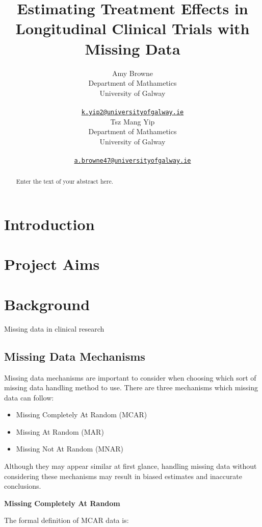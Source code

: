 \documentclass{article}
\title{Estimating Treatment Effects in Longitudinal Clinical Trials with
Missing Data}
\author{
    Amy Browne
   \\
    Department of Mathametics \\
    University of Galway \\
   \\
  \texttt{\href{mailto:k.yip2@universityofgalway.ie}{\nolinkurl{k.yip2@universityofgalway.ie}}} \\
   \And
    Tsz Mang Yip
   \\
    Department of Mathametics \\
    University of Galway \\
   \\
  \texttt{\href{mailto:a.browne47@universityofgalway.ie}{\nolinkurl{a.browne47@universityofgalway.ie}}} \\
  }
\providecommand{\tightlist}{%
  \setlength{\itemsep}{0pt}\setlength{\parskip}{0pt}}
\begin{document}
\maketitle


\begin{abstract}
Enter the text of your abstract here.
\end{abstract}


\section{Introduction}\label{introduction}

\section{Project Aims}\label{project-aims}

\section{Background}\label{background}

Missing data in clinical research

\subsection{Missing Data Mechanisms}\label{missing-data-mechanisms}

Missing data mechanisms are important to consider when choosing which
sort of missing data handling method to use. There are three mechanisms
which missing data can follow:

\begin{itemize}
\tightlist
\item
  Missing Completely At Random (MCAR)
\item
  Missing At Random (MAR)
\item
  Missing Not At Random (MNAR)
\end{itemize}

Although they may appear similar at first glance, handling missing data
without considering these mechanisms may result in biased estimates and
inaccurate conclusions.

\textbf{Missing Completely At Random}

The formal definition of MCAR data is:
\end{document}
